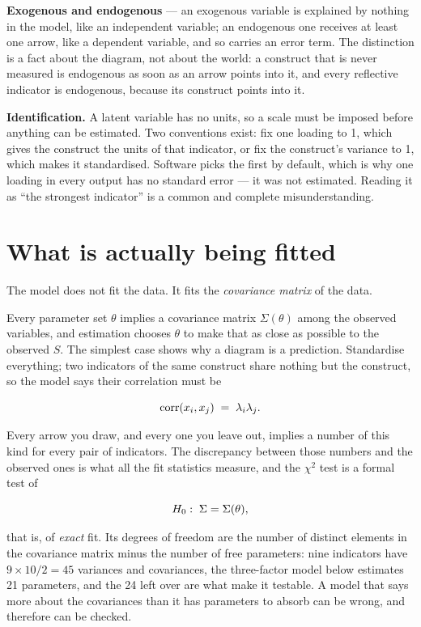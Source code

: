 \documentclass[
  letterpaper,
  10pt,
  twoside,
  openright,
  numbers=noenddot,
  chapterprefix=true]{scrbook}
\begin{document}
\begin{qmibdefinition}

{\textbf{Exogenous and endogenous}} --- an exogenous variable is
explained by nothing in the model, like an independent variable; an
endogenous one receives at least one arrow, like a dependent variable,
and so carries an error term. The distinction is a fact about the
diagram, not about the world: a construct that is never measured is
endogenous as soon as an arrow points into it, and every reflective
indicator is endogenous, because its construct points into it.

\end{qmibdefinition}

\textbf{Identification.} A latent variable has no units, so a scale must
be imposed before anything can be estimated. Two conventions exist: fix
one loading to 1, which gives the construct the units of that indicator,
or fix the construct's variance to 1, which makes it standardised.
Software picks the first by default, which is why one loading in every
output has no standard error --- it was not estimated. Reading it as
``the strongest indicator'' is a common and complete misunderstanding.

\section{What is actually being
fitted}\label{what-is-actually-being-fitted}

The model does not fit the data. It fits the \emph{covariance matrix} of
the data.

Every parameter set \(\theta\) implies a covariance matrix
\(\Sigma(\theta)\) among the observed variables, and estimation chooses
\(\theta\) to make that as close as possible to the observed \(S\). The
simplest case shows why a diagram is a prediction. Standardise
everything; two indicators of the same construct share nothing but the
construct, so the model says their correlation must be

\[
\operatorname{corr}(x_i, x_j) \thickspace=\thickspace \lambda_i \lambda_j .
\]

Every arrow you draw, and every one you leave out, implies a number of
this kind for every pair of indicators. The discrepancy between those
numbers and the observed ones is what all the fit statistics measure,
and the \(\chi^2\) test is a formal test of

\[
H_0: \thickspace \Sigma = \Sigma(\theta) ,
\]

that is, of \emph{exact} fit. Its degrees of freedom are the number of
distinct elements in the covariance matrix minus the number of free
parameters: nine indicators have \(9 \times 10 / 2 = 45\) variances and
covariances, the three-factor model below estimates 21 parameters, and
the 24 left over are what make it testable. A model that says more about
the covariances than it has parameters to absorb can be wrong, and
therefore can be checked.
\end{document}
